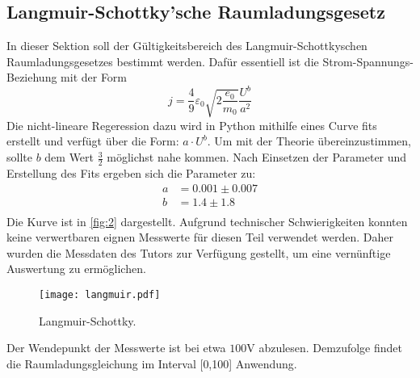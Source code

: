 \subsection{Langmuir-Schottky'sche Raumladungsgesetz}
In dieser Sektion soll der Gültigkeitsbereich des Langmuir-Schottkyschen 
Raumladungsgesetzes bestimmt werden. Dafür essentiell ist die Strom-Spannungs-
Beziehung mit der Form
\begin{equation}
    j = \frac{4}{9} \varepsilon_0 \sqrt{2 \frac{e_0}{m_0}} \frac{U^b}{a^2}
\end{equation}
Die nicht-lineare Regeression dazu wird in Python mithilfe eines Curve fits 
erstellt und verfügt über die Form: $a \cdot U^b$. Um mit der Theorie
übereinzustimmen, sollte $b$ dem Wert $\frac{3}{2}$ möglichst nahe kommen.
Nach Einsetzen der Parameter und Erstellung des Fits ergeben sich die Parameter 
zu:
\begin{align*}
    a &= 0.001 \pm 0.007 \\
    b &= 1.4 \pm 1.8 \\
\end{align*}
Die Kurve ist in \autoref{fig:2} dargestellt. Aufgrund technischer Schwierigkeiten
konnten keine verwertbaren eignen Messwerte für diesen Teil verwendet werden. 
Daher wurden die Messdaten des Tutors zur Verfügung gestellt, um eine vernünftige 
Auswertung zu ermöglichen.
\begin{figure}[H]
    \centering
    \texttt{[image: langmuir.pdf]}
    \caption{Langmuir-Schottky.}
    \label{fig:2}  %
\end{figure}
\noindent Der Wendepunkt der Messwerte ist bei etwa $100 \unit{\volt}$ abzulesen.
Demzufolge findet die Raumladungsgleichung im Interval [0,100] Anwendung.

